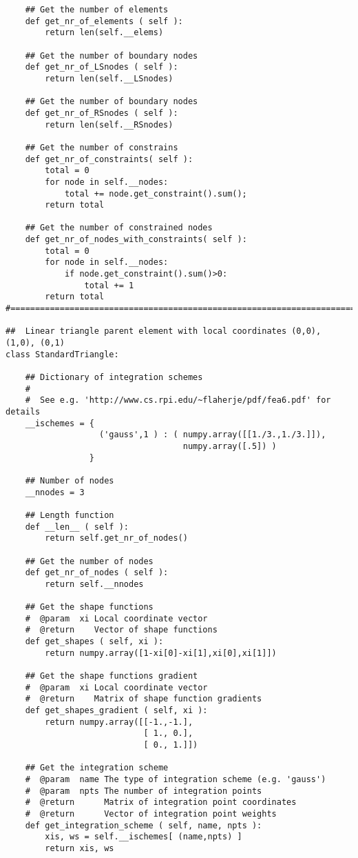 \begin{appendices}
\begin{verbatim}
    ## Get the number of elements
    def get_nr_of_elements ( self ):
        return len(self.__elems)
        
    ## Get the number of boundary nodes
    def get_nr_of_LSnodes ( self ):
        return len(self.__LSnodes)
        
    ## Get the number of boundary nodes
    def get_nr_of_RSnodes ( self ):
        return len(self.__RSnodes)

    ## Get the number of constrains
    def get_nr_of_constraints( self ):
        total = 0
        for node in self.__nodes:
            total += node.get_constraint().sum();
        return total

    ## Get the number of constrained nodes
    def get_nr_of_nodes_with_constraints( self ):
        total = 0
        for node in self.__nodes:
            if node.get_constraint().sum()>0:
                total += 1
        return total
#==============================================================================
    
##  Linear triangle parent element with local coordinates (0,0), (1,0), (0,1)
class StandardTriangle:
    
    ## Dictionary of integration schemes
    #
    #  See e.g. 'http://www.cs.rpi.edu/~flaherje/pdf/fea6.pdf' for details
    __ischemes = {
                   ('gauss',1 ) : ( numpy.array([[1./3.,1./3.]]),
                                    numpy.array([.5]) )
                 }

    ## Number of nodes
    __nnodes = 3

    ## Length function
    def __len__ ( self ):
        return self.get_nr_of_nodes()

    ## Get the number of nodes
    def get_nr_of_nodes ( self ):
        return self.__nnodes

    ## Get the shape functions
    #  @param  xi Local coordinate vector
    #  @return    Vector of shape functions
    def get_shapes ( self, xi ):
        return numpy.array([1-xi[0]-xi[1],xi[0],xi[1]])

    ## Get the shape functions gradient
    #  @param  xi Local coordinate vector
    #  @return    Matrix of shape function gradients
    def get_shapes_gradient ( self, xi ):
        return numpy.array([[-1.,-1.],
                            [ 1., 0.],
                            [ 0., 1.]])

    ## Get the integration scheme
    #  @param  name The type of integration scheme (e.g. 'gauss')
    #  @param  npts The number of integration points
    #  @return      Matrix of integration point coordinates
    #  @return      Vector of integration point weights
    def get_integration_scheme ( self, name, npts ):
        xis, ws = self.__ischemes[ (name,npts) ]
        return xis, ws


\end{verbatim}
\end{appendices}
